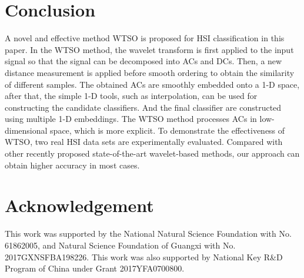 \documentclass{ws-ijwmip}
\begin{document}
%
%




\section{Conclusion}\label{sec:conclude}

A novel and effective method WTSO is proposed for HSI classification in this paper. In the WTSO method, the wavelet transform is first applied to the input signal so that the signal can be decomposed into ACs and DCs. Then, a new distance measurement is applied before smooth ordering to obtain the similarity of different samples. 
The obtained ACs are smoothly embedded onto a 1-D space, after that, the simple 1-D tools, such as interpolation, can be used for constructing the candidate classifiers. 
And the final classifier are constructed using multiple 1-D embeddings.
The WTSO method processes ACs in low-dimensional space, which is more explicit. To demonstrate the effectiveness of WTSO, two real HSI data sets are experimentally evaluated. Compared with other recently proposed state-of-the-art wavelet-based methods, our approach can obtain higher accuracy in most cases.

\section{Acknowledgement}
This work was supported by the National Natural Science Foundation with No. 61862005, and Natural Science Foundation of Guangxi with No. 2017GXNSFBA198226.
This work was also supported by National Key R\&D Program of China under Grant 2017YFA0700800.






\end{document}

